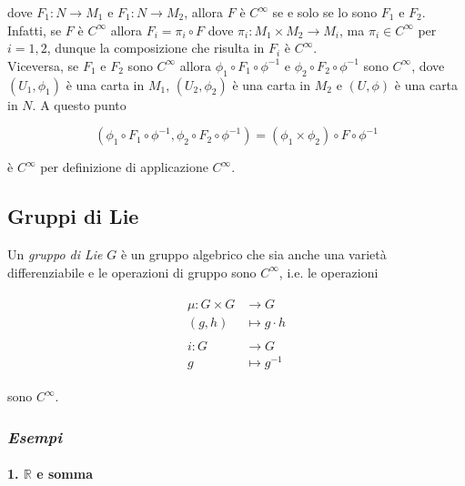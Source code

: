dove $ F_{1} : N \to M_{1} $ e $ F_{1} : N \to M_{2} $, allora $ F $ è $ C^{\infty} $ se e solo se lo sono $ F_{1} $ e $ F_{2} $.\\
Infatti, se $ F $ è $ C^{\infty} $ allora $ F_{i} = \pi_{i} \circ F $ dove $ \pi_{i} : M_{1} \times M_{2} \to M_{i} $, ma $ \pi_{i} \in C^{\infty} $ per $ i=1,2 $, dunque la composizione che risulta in $ F_{i} $ è $ C^{\infty} $.\\
Viceversa, se $ F_{1} $ e $ F_{2} $ sono $ C^{\infty} $ allora $ \phi_{1} \circ F_{1} \circ \phi^{-1} $ e $ \phi_{2} \circ F_{2} \circ \phi^{-1} $ sono $ C^{\infty} $, dove $ (U_{1},\phi_{1}) $ è una carta in $ M_{1} $, $ (U_{2},\phi_{2}) $ è una carta in $ M_{2} $ e $ (U,\phi) $ è una carta in $ N $. A questo punto

\begin{equation}
	(\phi_{1} \circ F_{1} \circ \phi^{-1}, \phi_{2} \circ F_{2} \circ \phi^{-1}) = (\phi_{1} \times \phi_{2}) \circ F \circ \phi^{-1}
\end{equation}

è $ C^{\infty} $ per definizione di applicazione $ C^{\infty} $.

\subsection{Gruppi di Lie}

Un \textit{gruppo di Lie} $ G $ è un gruppo algebrico che sia anche una varietà differenziabile e le operazioni di gruppo sono $ C^{\infty} $, i.e. le operazioni

\begin{align}
	\begin{split}
		\mu : G \times G &\to G\\
		(g,h) &\mapsto g \cdot h\\\\
		i : G &\to G\\
		g &\mapsto g^{-1}
	\end{split}
\end{align}

sono $ C^{\infty} $.

\subsubsection{\textit{Esempi}}

\paragraph{1. $ \mathbb{R} $ e somma}

